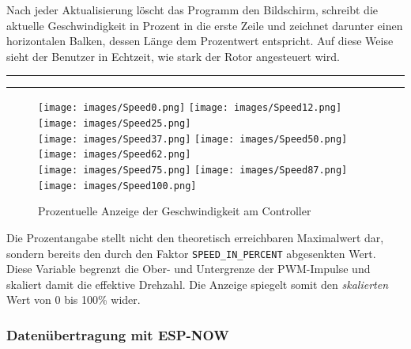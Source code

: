 \documentclass[a4paper,12pt]{article}
\begin{document}
Nach jeder Aktualisierung löscht das Programm den Bildschirm, schreibt die aktuelle Geschwindigkeit in Prozent in die erste Zeile und zeichnet darunter einen horizontalen Balken, dessen Länge dem Prozentwert entspricht. Auf diese Weise sieht der Benutzer in Echtzeit, wie stark der Rotor angesteuert wird. 
\newline\noindent\rule{\linewidth}{0.4pt}  %

\noindent\rule{\linewidth}{0.4pt}  %

\begin{figure}[htp]
\centering
\makebox[1em][l]{}%
\texttt{[image: images/Speed0.png]}\hspace{1pt}%
\texttt{[image: images/Speed12.png]}\hspace{1pt}%
\texttt{[image: images/Speed25.png]}\\
\makebox[1em][l]{}%
\texttt{[image: images/Speed37.png]}\hspace{1pt}%
\texttt{[image: images/Speed50.png]}\hspace{1pt}%
\texttt{[image: images/Speed62.png]}\\
\makebox[1em][l]{}%
\texttt{[image: images/Speed75.png]}\hspace{1pt}%
\texttt{[image: images/Speed87.png]}\hspace{1pt}%
\texttt{[image: images/Speed100.png]}
\caption{Prozentuelle Anzeige der Geschwindigkeit am Controller\label{fig:SpeedDisplay}}
\end{figure}

Die Prozentangabe stellt nicht den theoretisch erreichbaren Maximalwert dar, sondern bereits den durch den Faktor \texttt{SPEED\_IN\_PERCENT} abgesenkten Wert. Diese Variable begrenzt die Ober- und Untergrenze der PWM-Impulse und skaliert damit die effektive Drehzahl. Die Anzeige spiegelt somit den \emph{skalierten} Wert von 0 bis 100\% wider.

\subsubsection{Datenübertragung mit ESP-NOW}
\label{sec:Datenübertragung mit ESP-NOW}
\end{document}
